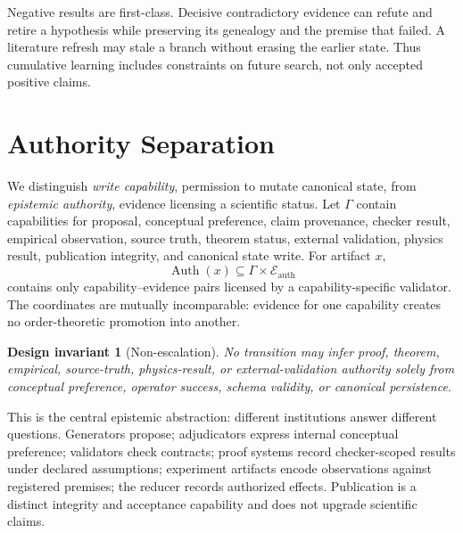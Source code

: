 \documentclass[11pt]{article}
\newtheorem{invariant}{Design invariant}
\begin{document}
Negative results are first-class. Decisive contradictory evidence can refute and retire a hypothesis while preserving its genealogy and the premise that failed. A literature refresh may stale a branch without erasing the earlier state. Thus cumulative learning includes constraints on future search, not only accepted positive claims.

\section{Authority Separation}

We distinguish \emph{write capability}, permission to mutate canonical state, from \emph{epistemic authority}, evidence licensing a scientific status. Let $\Gamma$ contain capabilities for proposal, conceptual preference, claim provenance, checker result, empirical observation, source truth, theorem status, external validation, physics result, publication integrity, and canonical state write. For artifact $x$,
\[
  \operatorname{Auth}(x)\subseteq \Gamma\times\mathcal{E}_{\mathrm{auth}}
\]
contains only capability--evidence pairs licensed by a capability-specific validator. The coordinates are mutually incomparable: evidence for one capability creates no order-theoretic promotion into another.

\begin{invariant}[Non-escalation]
No transition may infer proof, theorem, empirical, source-truth, physics-result, or external-validation authority solely from conceptual preference, operator success, schema validity, or canonical persistence.
\end{invariant}

This is the central epistemic abstraction: different institutions answer different questions. Generators propose; adjudicators express internal conceptual preference; validators check contracts; proof systems record checker-scoped results under declared assumptions; experiment artifacts encode observations against registered premises; the reducer records authorized effects. Publication is a distinct integrity and acceptance capability and does not upgrade scientific claims.
\end{document}
